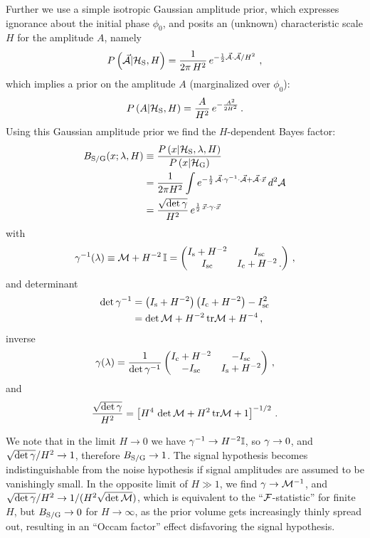 \documentclass[aps,prd,onecolumn,notitlepage,nofootinbib,superscriptaddress,altaffilletter,floatfix]{revtex4-1}
\begin{document}
Further we use a simple isotropic Gaussian amplitude prior, which expresses ignorance about the initial phase $\phi_0$, and posits an (unknown)
characteristic scale $H$ for the amplitude $A$, namely
\begin{equation}
  \label{eq:22}
  P\left(\vec{\mathcal{A}}|\mathcal{H}_{\mathrm{S}},H\right) = \frac{1}{2\pi\,H^2}\,e^{-\frac{1}{2}{\vec{\mathcal{A}}\cdot\vec{\mathcal{A}}}/H^2}\,\,,
\end{equation}
which implies a prior on the amplitude $A$ (marginalized over $\phi_0$):
\begin{equation}
  \label{eq:28}
  P\left(A|\mathcal{H}_{\mathrm{S}}, H\right) = \frac{A}{H^2}\,e^{-\frac{A^2}{2H^2}}\,.
\end{equation}
Using this Gaussian amplitude prior we find the $H$-dependent Bayes factor:
\begin{align}
  \label{eq:29}
  B_{\mathrm{S/G}}(x;\lambda,H) &\equiv \frac{P\left(x|\mathcal{H}_{\mathrm{S}},\lambda,H\right)}{P\left(x|\mathcal{H}_{\mathrm{G}}\right)}\\
  &=\frac{1}{2\pi H^2}\int e^{-\frac{1}{2}\,\vec{\mathcal{A}}\cdot\gamma^{-1}\cdot\vec{\mathcal{A}} + \vec{\mathcal{A}}\cdot\vec{x}}\,d^2\mathcal{A}\\
  &= \frac{\sqrt{\det\gamma}}{H^2}\, e^{\frac{1}{2}\,\vec{x}\cdot\gamma\cdot\vec{x}}
\end{align}
with
\begin{equation}
  \label{eq:25}
  \gamma^{-1}(\lambda) \equiv \mathcal{M} + H^{-2}\,\mathbb{I} =
  \begin{pmatrix}
    I_{\mathrm{s}} + H^{-2} & I_{\mathrm{sc}} \\
    I_{\mathrm{sc}}        & I_{\mathrm{c}} + H^{-2}\,.
  \end{pmatrix}\,,
\end{equation}
and determinant
\begin{align}
  \label{eq:39}
  \det\gamma^{-1} &= \left(I_{\mathrm{s}} + H^{-2}\right)\left(I_{\mathrm{c}}+H^{-2}\right) - I_{\mathrm{sc}}^2\\
  &=\det\mathcal{M} + H^{-2}\,\mathrm{tr}\mathcal{M} + H^{-4}\,,
\end{align}
inverse
\begin{equation}
  \label{eq:41}
  \gamma(\lambda) = \frac{1}{\det\gamma^{-1}}
  \begin{pmatrix}
    I_{\mathrm{c}} + H^{-2} & -I_{\mathrm{sc}} \\
    -I_{\mathrm{sc}}        & I_{\mathrm{s}} + H^{-2}
  \end{pmatrix}\,,
\end{equation}
and
\begin{equation}
  \label{eq:40}
  \frac{\sqrt{\det\gamma}}{H^2} = \left[H^4\,\det\mathcal{M} + H^2\,\mathrm{tr}\mathcal{M} + 1\right]^{-1/2}\,.
\end{equation}

We note that in the limit $H\rightarrow0$ we have $\gamma^{-1}\rightarrow H^{-2}\mathbb{I}$, so $\gamma\rightarrow0$, and
$\sqrt{\det\gamma}/H^2\rightarrow 1$, therefore $B_{\mathrm{S/G}}\rightarrow 1$.
The signal hypothesis becomes indistinguishable from the noise hypothesis if signal amplitudes are assumed to be vanishingly small.
In the opposite limit of $H\gg 1$, we find $\gamma\rightarrow\mathcal{M}^{-1}$, and $\sqrt{\det\gamma}/H^2\rightarrow 1/(H^2\sqrt{\det\mathcal{M}})$, which is equivalent to
the ``$\mathcal{F}$-statistic'' for finite $H$, but $B_{\mathrm{S/G}}\rightarrow 0$ for $H\rightarrow \infty$, as the prior volume gets increasingly thinly spread out,
resulting in an ``Occam factor'' effect disfavoring the signal hypothesis.
\end{document}

